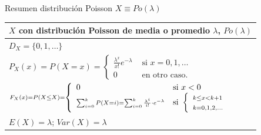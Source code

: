 \documentclass[
  ignorenonframetext,
  aspectratio=169]{beamer}
\begin{document}
\begin{frame}{Resumen distribución Poisson \(X\equiv Po(\lambda)\)}
\protect\hypertarget{resumen-distribuciuxf3n-poisson-xequiv-polambda}{}
\renewcommand{\arraystretch}{1.75}
\begin{table}
\centering
\begin{tabular}{|l|}
\hline\rowcolor{LightBlue}
$X$ con distribución  Poisson  de media o promedio $\lambda$,  $Po(\lambda)$
\\\hline
$D_X=\{0,1,\ldots \}$ \\\hline
$P_X(x)=P(X=x)=\left\{\begin{array}{ll}  \frac{\lambda^x}{x!}e^{-\lambda} & \mbox{ si } x=0,1,\ldots\\ 0  & \mbox{ en otro caso.}\end{array}\right.$\\\hline
$\scriptstyle F_X(x)=P(X\leq X)=\left\{\begin{array}{ll} 0 & \mbox{si } x<0\\\displaystyle\scriptstyle\sum_{i=0}^{k} P(X=i)= \displaystyle\scriptstyle\sum_{i=0}^{k} \frac{\lambda^i}{i!}\cdot e^{-\lambda} & \mbox{si  }\left\{\begin{array}{l}\scriptstyle k\leq x< k+1\\\scriptstyle k=0,1,2,\ldots\end{array}\right.\end{array}\right.$
     \\\hline
$E(X)=\lambda$; $Var(X)=\lambda$\\\hline
\end{tabular}
\end{table}
\end{frame}
\end{document}
